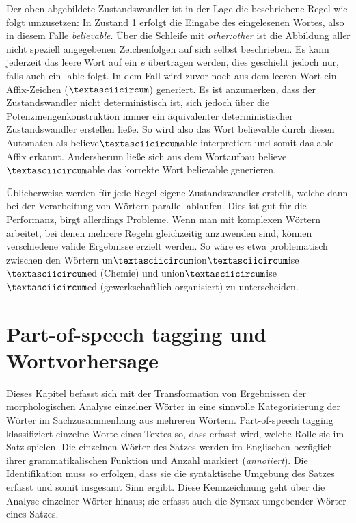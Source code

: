 \documentclass[12pt]{report}
\begin{document}
Der oben abgebildete Zustandswandler ist in der Lage die beschriebene Regel wie folgt umzusetzen: In Zustand 1 erfolgt die Eingabe des eingelesenen Wortes, also in diesem Falle \textit{\glqq  believable\grqq{}}. Über die Schleife mit \textit{\glqq  other:other\grqq{}} ist die Abbildung aller nicht speziell angegebenen Zeichenfolgen auf sich selbst beschrieben. Es kann jederzeit das leere Wort auf ein \textit{\glqq  e\grqq{}} übertragen werden, dies geschieht jedoch nur, falls auch ein \glqq  -able\grqq{} folgt. In dem Fall wird zuvor noch aus dem leeren Wort ein Affix-Zeichen ($\textasciicircum$) generiert. Es ist anzumerken, dass der Zustandswandler nicht deterministisch ist, sich jedoch über die Potenzmengenkonstruktion immer ein äquivalenter deterministischer Zustandswandler erstellen ließe. So wird also das Wort \glqq  believable\grqq{} durch diesen Automaten als \glqq  believe$\textasciicircum$able\grqq{} interpretiert und somit das \glqq  able\grqq{}-Affix erkannt. Andersherum ließe sich aus dem Wortaufbau \glqq  believe$\textasciicircum$able\grqq{} das korrekte Wort \glqq  believable\grqq{} generieren.

Üblicherweise werden für jede Regel eigene Zustandswandler erstellt, welche dann bei der Verarbeitung von Wörtern parallel ablaufen. Dies ist gut für die Performanz, birgt allerdings Probleme. Wenn man mit komplexen Wörtern arbeitet, bei denen mehrere Regeln gleichzeitig anzuwenden sind, können verschiedene valide Ergebnisse erzielt werden. So wäre es etwa problematisch zwischen den Wörtern \glqq  un$\textasciicircum$ion$\textasciicircum$ise$\textasciicircum$ed\grqq{} (Chemie) und \glqq  union$\textasciicircum$ise$\textasciicircum$ed\grqq{} (gewerkschaftlich organisiert) zu unterscheiden. 

\section[POS tagging und Wortvorhersage]{Part-of-speech tagging und \\Wortvorhersage}
Dieses Kapitel befasst sich mit der Transformation von Ergebnissen der morphologischen Analyse einzelner Wörter in eine sinnvolle Kategorisierung der Wörter im Sachzusammenhang aus mehreren Wörtern. Part-of-speech tagging klassifiziert einzelne Worte eines Textes so, dass erfasst wird, welche Rolle sie im Satz spielen. Die einzelnen Wörter des Satzes werden im Englischen bezüglich ihrer grammatikalischen Funktion und Anzahl markiert (\textit{annotiert}). Die Identifikation muss so erfolgen, dass sie die syntaktische Umgebung des Satzes erfasst und somit insgesamt Sinn ergibt. Diese Kennzeichnung geht über die Analyse einzelner Wörter hinaus; sie erfasst auch die Syntax umgebender Wörter eines Satzes. 
\end{document}
